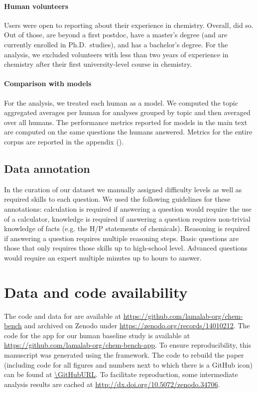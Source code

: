 \documentclass[11pt, oneside]{article}
\begin{document}
\begin{refsection}
\paragraph{Human volunteers}
Users were open to reporting about their experience in chemistry.
Overall,  did so.
Out of those,  are beyond a first postdoc,  have a master's degree (and are currently enrolled in Ph.D.\ studies), and  has a bachelor's degree. For the analysis, we excluded volunteers with less than two years of experience in chemistry after their first university-level course in chemistry.


\paragraph{Comparison with models}
For the analysis, we treated each human as a model. We computed the topic aggregated averages per human for analyses grouped by topic and then averaged over all humans. The performance metrics reported for models in the main text are computed on the same questions the humans answered. Metrics for the entire corpus are reported in the appendix ().

\subsection{Data annotation}\label{sec:meth-topic}
In the curation of our dataset we manually assigned difficulty levels as well as required skills to each question. We used the following guidelines for these annotations: calculation is required if answering a question would require the use of a calculator, knowledge is required if answering a question requires non-trivial knowledge of facts (e.g. the H/P statements of chemicals). Reasoning is required if answering a question requires multiple reasoning steps.
Basic questions are those that only requires those skills up to high-school level. Advanced questions would require an expert multiple minutes up to hours to answer.

\section*{Data and code availability}
The code and data for \chembench are available at \url{https://github.com/lamalab-org/chem-bench} and archived on Zenodo under \href{10.5281/zenodo.14010212}{https://zenodo.org/records/14010212}.
The code for the app for our human baseline study is available at \url{https://github.com/lamalab-org/chem-bench-app}.
To ensure reproducibility, this manuscript was generated using the \href{https://show-your.work/en/latest/}{\showyourwork} framework.\autocite{Luger2021}
The code to rebuild the paper (including code for all figures and numbers next to which there is a GitHub icon) can be found at \url{\GitHubURL}.
To facilitate reproduction, some intermediate analysis results are cached at \url{http://dx.doi.org/10.5072/zenodo.34706}.


\end{refsection}
\end{document}
